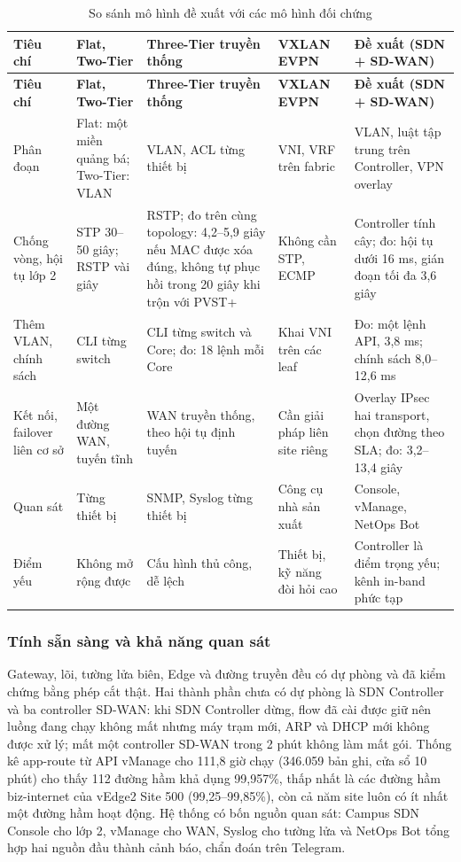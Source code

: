 \begingroup
\small
\setlength{\tabcolsep}{3pt}
\begin{longtable}{|L{2.2cm}|L{2.9cm}|L{3.0cm}|L{2.9cm}|L{3.35cm}|}
    \caption{So sánh mô hình đề xuất với các mô hình đối chứng}\label{tab:so_sanh_mo_hinh} \\
    \hline
    \textbf{Tiêu chí} & \textbf{Flat, Two-Tier} & \textbf{Three-Tier truyền thống} & \textbf{VXLAN EVPN} & \textbf{Đề xuất (SDN + SD-WAN)} \\
    \hline
    \endfirsthead
    \hline
    \textbf{Tiêu chí} & \textbf{Flat, Two-Tier} & \textbf{Three-Tier truyền thống} & \textbf{VXLAN EVPN} & \textbf{Đề xuất (SDN + SD-WAN)} \\
    \hline
    \endhead
    \hline
    \endfoot
    Phân đoạn & Flat: một miền quảng bá; Two-Tier: VLAN & VLAN, ACL từng thiết bị & VNI, VRF trên fabric & VLAN, luật tập trung trên Controller, VPN overlay \\
    \hline
    Chống vòng, hội tụ lớp 2 & STP 30--50 giây; RSTP vài giây & RSTP; đo trên cùng topology: 4,2--5,9 giây nếu MAC được xóa đúng, không tự phục hồi trong 20 giây khi trộn với PVST+ & Không cần STP, ECMP & Controller tính cây; đo: hội tụ dưới 16 ms, gián đoạn tối đa 3,6 giây \\
    \hline
    Thêm VLAN, chính sách & CLI từng switch & CLI từng switch và Core; đo: 18 lệnh mỗi Core & Khai VNI trên các leaf & Đo: một lệnh API, 3,8 ms; chính sách 8,0--12,6 ms \\
    \hline
    Kết nối, failover liên cơ sở & Một đường WAN, tuyến tĩnh & WAN truyền thống, theo hội tụ định tuyến & Cần giải pháp liên site riêng & Overlay IPsec hai transport, chọn đường theo SLA; đo: 3,2--13,4 giây \\
    \hline
    Quan sát & Từng thiết bị & SNMP, Syslog từng thiết bị & Công cụ nhà sản xuất & Console, vManage, NetOps Bot \\
    \hline
    Điểm yếu & Không mở rộng được & Cấu hình thủ công, dễ lệch & Thiết bị, kỹ năng đòi hỏi cao & Controller là điểm trọng yếu; kênh in-band phức tạp \\
\end{longtable}
\endgroup

\subsubsection{Tính sẵn sàng và khả năng quan sát}\label{sec:san_sang}

Gateway, lõi, tường lửa biên, Edge và đường truyền đều có dự phòng và đã kiểm chứng bằng phép cắt thật. Hai thành phần chưa có dự phòng là SDN Controller và ba controller SD-WAN: khi SDN Controller dừng, flow đã cài được giữ nên luồng đang chạy không mất nhưng máy trạm mới, ARP và DHCP mới không được xử lý; mất một controller SD-WAN trong 2 phút không làm mất gói. Thống kê app-route từ API vManage cho 111,8 giờ chạy (346.059 bản ghi, cửa sổ 10 phút) cho thấy 112 đường hầm khả dụng 99,957\%, thấp nhất là các đường hầm biz-internet của vEdge2 Site 500 (99,25--99,85\%), còn cả năm site luôn có ít nhất một đường hầm hoạt động. Hệ thống có bốn nguồn quan sát: Campus SDN Console cho lớp 2, vManage cho WAN, Syslog cho tường lửa và NetOps Bot tổng hợp hai nguồn đầu thành cảnh báo, chẩn đoán trên Telegram.

